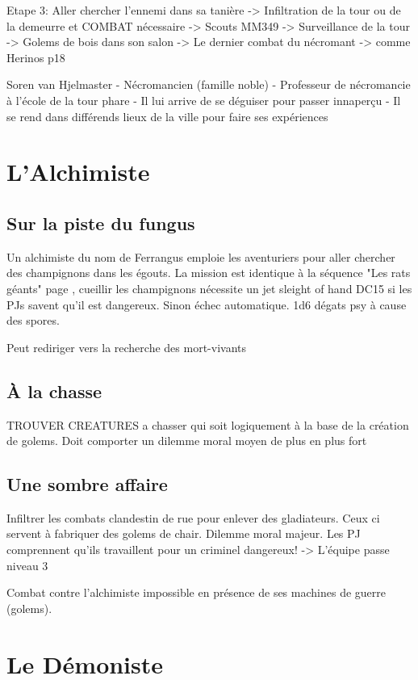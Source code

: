 Etape 3: Aller chercher l'ennemi dans sa tanière
 -> Infiltration de la tour ou de la demeurre et COMBAT nécessaire -> Scouts MM349
 -> Surveillance de la tour
 -> Golems de bois dans son salon
 -> Le dernier combat du nécromant -> comme Herinos p18

Soren van Hjelmaster
 - Nécromancien (famille noble)
 - Professeur de nécromancie à l'école de la tour phare
 - Il lui arrive de se déguiser pour passer innaperçu
 - Il se rend dans différends lieux de la ville pour faire ses expériences


\section{L'Alchimiste}

\subsection{Sur la piste du fungus}

Un alchimiste du nom de Ferrangus emploie les aventuriers pour aller chercher des champignons dans les
égouts. La mission est identique à la séquence "Les rats géants" page \pageref{ss:RatsGeants}, cueillir 
les champignons nécessite un jet sleight of hand DC15
si les PJs savent qu'il est dangereux. Sinon échec automatique. 1d6 dégats psy à cause des spores.

Peut rediriger vers la recherche des mort-vivants 

\subsection{À la chasse}

TROUVER CREATURES a chasser qui soit logiquement à la base de la création de golems. Doit comporter
un dilemme moral moyen de plus en plus fort

\subsection{Une sombre affaire}

Infiltrer les combats clandestin de rue pour enlever des gladiateurs. Ceux ci servent à fabriquer
des golems de chair. Dilemme moral majeur. Les PJ comprennent qu'ils travaillent pour un criminel
dangereux!
 -> L'équipe passe niveau 3

Combat contre l'alchimiste impossible en présence de ses machines de guerre (golems).

\section{Le Démoniste}
\label{Demoniste}

